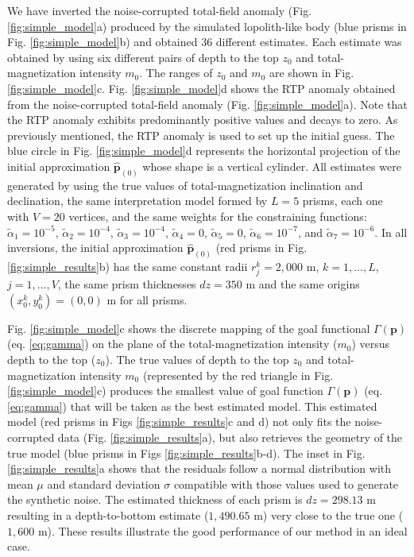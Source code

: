 We have inverted the noise-corrupted total-field anomaly (Fig. \ref{fig:simple_model}a) produced by the simulated lopolith-like body (blue prisms in Fig. \ref{fig:simple_model}b) and obtained 36 different estimates. 
Each estimate was obtained by using six different pairs of depth to the top $ z_0 $ and total-magnetization intensity $ m_0 $.
The ranges of $ z_0 $ and $ m_0 $ are shown in Fig. \ref{fig:simple_model}c. 
Fig. \ref{fig:simple_model}d shows the RTP anomaly obtained from the noise-corrupted 
total-field anomaly (Fig. \ref{fig:simple_model}a).
Note that the RTP anomaly exhibits predominantly positive values and decays to zero.
As previously mentioned, the RTP anomaly is used to set up the initial guess. 
The blue circle in Fig. \ref{fig:simple_model}d represents the horizontal projection 
of the initial approximation $\hat{\mathbf{p}}_{(0)}$ whose shape is a vertical cylinder.
All estimates were generated by using the true values of total-magnetization inclination and declination, the same interpretation model formed by $ L = 5 $ prisms, 
each one with $ V = 20 $ vertices, and the same weights for the constraining functions: 
$\tilde{\alpha}_1 = 10^{-5}$, 
$\tilde{\alpha}_2 = 10^{-4}$, 
$\tilde{\alpha}_3 = 10^{-4}$, 
$\tilde{\alpha}_4 = 0$, 
$\tilde{\alpha}_5 = 0$, 
$\tilde{\alpha}_6 = 10^{-7}$, and 
$\tilde{\alpha}_7 = 10^{-6}$. 
In all inversions, the initial approximation $\hat{\mathbf{p}}_{(0)}$ (red prisms in Fig. \ref{fig:simple_results}b) has the same constant radii $ r^k_j = 2,000 $ m, 
$ k = 1, \dots, L $, $ j  = 1, \dots, V $, the same prism thicknesses $ dz = 350 $ m and the same origins $(x^k_0, y^k_0) = (0, 0) $ m for all prisms.

Fig. \ref{fig:simple_model}c shows the discrete mapping of the goal functional 
$ \Gamma(\mathbf{p}) $ (eq. \ref{eq:gamma}) on the plane of the total-magnetization intensity ($ m_0 $) versus depth to the top ($ z_0 $). 
The true values of depth to the top $ z_0 $ and total-magnetization intensity $ m_0 $ (represented by the red triangle in Fig. \ref{fig:simple_model}c) produces 
the smallest value of goal function  $ \Gamma(\mathbf{p}) $ (eq. \ref{eq:gamma})
that will be taken as the best estimated model.
This estimated model (red prisms in Figs \ref{fig:simple_results}c and d) 
not only fits the noise-corrupted data (Fig. \ref{fig:simple_results}a), 
but also retrieves the geometry of the true model (blue prisms in Figs \ref{fig:simple_results}b-d). 
The inset in Fig. \ref{fig:simple_results}a shows that the residuals follow a normal distribution with mean $ \mu $ and standard deviation $ \sigma $ compatible with those values used to generate the synthetic noise. 
The estimated thickness of each prism is $ dz = 298.13 $ m resulting in a depth-to-bottom estimate ($ 1,490.65$ m) very close to the true one ($ 1,600 $ m). 
These results illustrate the good performance of our method in an ideal case.



